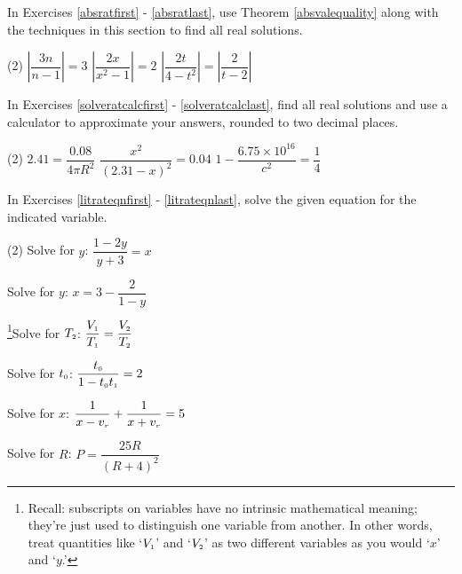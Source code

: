 In Exercises \ref{absratfirst} - \ref{absratlast}, use Theorem \ref{absvalequality} along with the techniques in this section to find all real solutions.

\begin{tasks}[resume](2)
\task $\left|\dfrac{3n}{n-1}  \right| = 3$ \label{absratfirst}
\task $\left| \dfrac{2x}{x^2-1}\right| = 2$
\task $\left| \dfrac{2t}{4-t^2}\right| = \left|\dfrac{2}{t-2}\right|$ \label{absratlast}

\end{tasks}

In Exercises \ref{solveratcalcfirst} - \ref{solveratcalclast}, find all real solutions and use a calculator to approximate your answers, rounded to two decimal places.

\begin{tasks}[resume](2)
\task $2.41 = \dfrac{0.08}{4 \pi R^2}$ \label{solveratcalcfirst}
\task $\dfrac{x^2}{(2.31 -x)^2} = 0.04$
\task $1 - \dfrac{6.75 \times 10^{16}}{c^2} = \dfrac{1}{4}$ \label{solveratcalclast}

\end{tasks}

In Exercises \ref{litrateqnfirst} - \ref{litrateqnlast}, solve the given equation for the indicated variable.

\begin{tasks}[resume](2)
\task Solve for $y$:  $\dfrac{1-2y}{y+3} = x$ \label{litrateqnfirst}

\task Solve for $y$: $x = 3 - \dfrac{2}{1-y}$ 

\task\hspace{-0.1in}\footnote{Recall: subscripts on variables have no intrinsic mathematical meaning; they're just used to distinguish one variable from another.  In other words, treat quantities like `$V_{\text{\tiny $1$}}$' and `$V_{\text{\tiny $2$}}$'  as two different variables as you would `$x$' and `$y$.'}Solve for $T_{\text{\tiny $2$}}$:  $\dfrac{V_{\text{\tiny $1$}}}{T_{\text{\tiny $1$}}} = \dfrac{V_{\text{\tiny $2$}}}{T_{\text{\tiny $2$}}}$


\task  Solve for $t_{\text{\tiny $0$}}$:  $\dfrac{t_{\text{\tiny $0$}}}{1-t_{\text{\tiny $0$}}t_{\text{\tiny $1$}}} = 2$ 


\task  Solve for $x$:  $\dfrac{1}{x - v_{\text{\tiny $r$}}} + \dfrac{1}{x + v_{\text{\tiny $r$}}} = 5$

\task Solve for $R$:  $P = \dfrac{25R}{(R+4)^2}$ \label{litrateqnlast}

\end{tasks}

